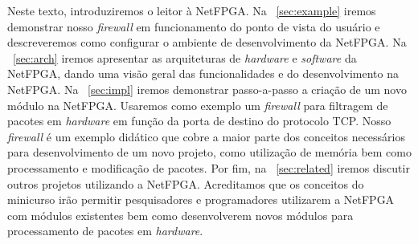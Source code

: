 Neste texto, introduziremos o leitor à NetFPGA. Na
\secstr~\ref{sec:example} iremos demonstrar nosso \emph{firewall} em
funcionamento do ponto de vista do usuário e descreveremos como
configurar o ambiente de desenvolvimento da NetFPGA.  Na
\secstr~\ref{sec:arch} iremos apresentar as arquiteturas de
\emph{hardware} e \emph{software} da NetFPGA, dando uma visão geral das
funcionalidades e do desenvolvimento na NetFPGA.  Na
\secstr~\ref{sec:impl} iremos demonstrar passo-a-passo a criação de um
novo módulo na NetFPGA.  Usaremos como exemplo um \emph{firewall} para
filtragem de pacotes em \emph{hardware} em função da porta de destino do
protocolo TCP.  Nosso \emph{firewall} é um exemplo didático que cobre a
maior parte dos conceitos necessários para desenvolvimento de um novo
projeto, como utilização de memória bem como processamento e modificação
de pacotes.  Por fim, na \secstr~\ref{sec:related} iremos discutir
outros projetos utilizando a NetFPGA.  Acreditamos que os conceitos do
minicurso irão permitir pesquisadores e programadores utilizarem a
NetFPGA com módulos existentes bem como desenvolverem novos módulos para
processamento de pacotes em \emph{hardware}.

